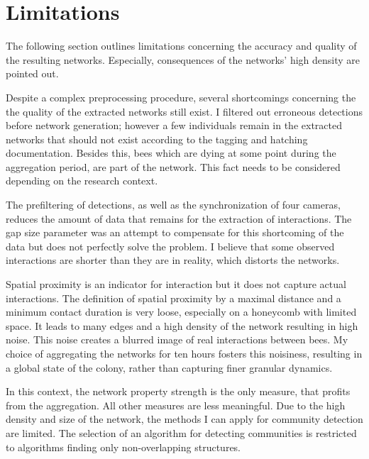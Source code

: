 \section{Limitations}
The following section outlines limitations concerning the accuracy and quality of the resulting networks.
Especially, consequences of the networks' high density are pointed out.

Despite a complex preprocessing procedure, several shortcomings concerning the 
the quality of the extracted networks still exist.
I filtered out erroneous detections before network generation; however a few individuals remain in the extracted networks that should not exist according to the tagging and hatching documentation.
Besides this, bees which are dying at some point during the aggregation period, are part of the network.
This fact needs to be considered depending on the research context.

The prefiltering of detections, as well as the synchronization of four cameras, reduces the amount of data that remains for the extraction of interactions.
The gap size parameter was an attempt to compensate for this shortcoming of the data but does not perfectly solve the problem.
I believe that some observed interactions are shorter than they are in reality, which distorts the networks.

Spatial proximity is an indicator for interaction but it does not capture actual interactions.
The definition of spatial proximity by a maximal distance and a minimum contact duration is very loose, especially on a honeycomb with limited space.
It leads to many edges and a high density of the network resulting in high noise.
This noise creates a blurred image of real interactions between bees.
My choice of aggregating the networks for ten hours fosters this noisiness, resulting in a global state of the colony, rather than capturing finer granular dynamics.

In this context, the network property strength is the only measure, that profits from the aggregation.
All other measures are less meaningful.
Due to the high density and size of the network, the methods I can apply for community detection are limited.
The selection of an algorithm for detecting communities is restricted to algorithms finding only non-overlapping structures.

